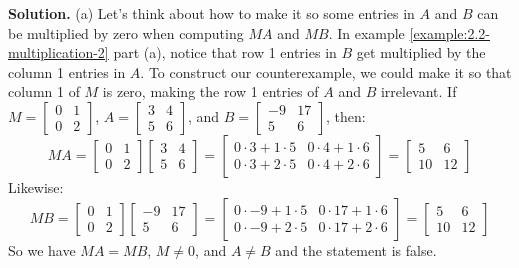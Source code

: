 \documentclass[11pt, letterpaper]{report}
\newenvironment{book}{}{}
\newcounter{example}[section]
\begin{document}
\begin{book}
\textbf{Solution.} (a) Let's think about how to make it so some entries in $A$ and $B$ can be multiplied by zero when computing $MA$ and $MB$. In example \ref{example:2.2-multiplication-2} part (a), notice that row 1 entries in $B$ get multiplied by the column 1 entries in $A$. To construct our counterexample, we could make it so that column 1 of $M$ is zero, making the row 1 entries of $A$ and $B$ irrelevant. If $M=\begin{bmatrix}
0 & 1 \\
0 & 2
\end{bmatrix}$, $A = \begin{bmatrix}
3 & 4 \\
5 & 6
\end{bmatrix}$, and $B = \begin{bmatrix}
-9 & 17 \\
5 & 6
\end{bmatrix}$, then:
\[MA = \begin{bmatrix}
0 & 1 \\
0 & 2
\end{bmatrix} \begin{bmatrix}
3 & 4 \\
5 & 6
\end{bmatrix} = \begin{bmatrix}
0\cdot 3 + 1\cdot 5 & 0 \cdot4 + 1\cdot 6 \\
0\cdot 3 + 2\cdot 5 & 0 \cdot4 + 2\cdot 6 
\end{bmatrix} = \begin{bmatrix}
5 & 6 \\
10 & 12
\end{bmatrix}\]
Likewise:
\[MB = \begin{bmatrix}
0 & 1 \\
0 & 2
\end{bmatrix} \begin{bmatrix}
-9 & 17 \\
5 & 6
\end{bmatrix} = \begin{bmatrix}
0\cdot -9 + 1\cdot 5 & 0 \cdot17 + 1\cdot 6 \\
0\cdot -9 + 2\cdot 5 & 0 \cdot17 + 2\cdot 6 
\end{bmatrix} = \begin{bmatrix}
5 & 6 \\
10 & 12
\end{bmatrix}\]
So we have $MA=MB$, $M\ne 0$, and $A \ne B$ and the statement is false.


\end{book}
\end{document}
